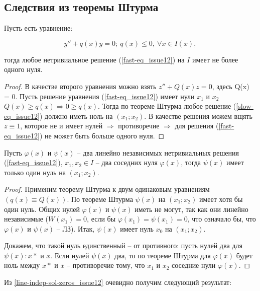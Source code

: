 \subsection{Следствия из теоремы Штурма}

\begin{corollary}\label{zero-quant_in-diff_issue12}
Пусть есть уравнение:

\[y'' + q(x)y = 0; \: q(x) \leq0, \: \forall x \in I(x),\]

тогда любое нетривиальное решение (\ref{fast-eq_issue12}) на $I$ имеет не более одного нуля.
\end{corollary}

\begin{proof}
В качестве второго уравнения можно взять $z'' + Q(x)z = 0$, здесь Q(x) = 0. Пусть решение уравнения (\ref{fast-eq_issue12}) имеет нули $x_1$ и $x_2$ $Q(x) \geq q(x) \Rightarrow 0 \geq q(x)$. Тогда по теореме Штурма любое решение (\ref{slow-eq_issue12}) должно иметь ноль на $(x_1;x_2)$. В качестве решения можем вщять $z\equiv 1$, которое не и имеет нулей $\Rightarrow$ противоречие $\Rightarrow$ для решения (\ref{fast-eq_issue12}) не может быть больше одного нуля.
\end{proof}

\begin{corollary}\label{line-indep-sol-zeros_issue12}
Пусть $\varphi (x)$ и $\psi (x)$ -- два линейно независимых нетривиальных решения (\ref{fast-eq_issue12}), $x_1, x_2 \in I$ -- два соседних нуля $\varphi (x)$, тогда $\psi (x)$ имеет только один нуль на $(x_1;x_2)$.
\end{corollary}

\begin{proof}
Применим теорему Штурма к двум одинаковым уравнениям $(q(x) \equiv Q(x))$. По теореме Штурма $\psi (x)$ на $(x_1;x_2)$ имеет хотя бы один нуль. Общих нулей $\varphi (x)$ и $\psi (x)$ иметь не могут, так как они линейно независимые ($W(x_1) = 0$, если бы $\varphi (x_1) = \psi (x_1) = 0$, что означало бы, что $\varphi(x)$ и $\psi(x)$ -- ЛЗ). Итак, $\psi (x)$ имеет нуль $x_0$ на $(x_1;x_2)$.

Докажем, что такой нуль единственный -- от противного: пусть нулей два для $\psi (x): x*$ и $\overline{x}$. Если нулей $\psi (x)$ два, то по теореме Штурма для $\varphi (x)$ будет ноль между $x*$ и $\overline{x}$ -- противоречие тому, что $x_1$ и $x_2$ соседние нули $\varphi (x)$.
\end{proof}

Из \ref{line-indep-sol-zeros_issue12} очевидно получим следующий результат:

